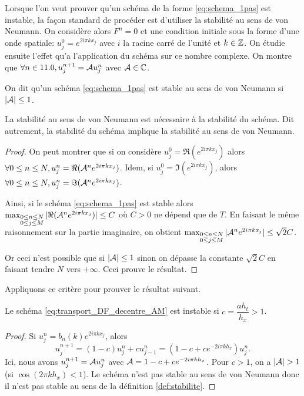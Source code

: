 \documentclass[12pt,a4paper,twoside]{article}
\begin{document}
Lorsque l'on veut prouver qu'un sch\'ema de la forme \eqref{eq:schema_1pas}
est instable, la fa\c{c}on standard
de proc\'eder est d'utiliser la stabilit\'e au sens de von Neumann.
On consid\`ere alors $F^n = 0$ et une condition initiale sous la forme
d'une onde spatiale: $u_j^0 = e^{2 i \pi k x_j}$ avec $i$ la racine carr\'e de l'unit\'e
et $k \in \mathbb{Z}$.
On \'etudie ensuite l'effet qu'a l'application du sch\'ema sur ce nombre complexe.
On montre que $\forall n \in 11.0, u_j^{n+1} = \mathcal{A} u_j^n$ avec $\mathcal{A} \in \mathbb{C}$.
\begin{definition}
  On dit qu'un sch\'ema \eqref{eq:schema_1pas} est stable au
  sens de von Neumann si $| \mathcal{A} | \leq 1$.
\end{definition}
\begin{proposition}
  La stabilit\'e au sens de von Neumann est n\'ecessaire \`a la stabilit\'e du sch\'ema.
  Dit autrement, la stabilit\'e du sch\'ema implique la stabilit\'e au sens de 
  von Neumann.
\end{proposition}
\begin{proof}
  On peut montrer que si on consid\`ere $u_j^0 = \Re (e^{2 i \pi k x_j})$
  alors $\forall 0 \leq n \leq N, u_j^n = \Re (\mathcal{A}^n e^{2 i \pi k x_j})$.
  Idem, si $u_j^0 = \Im (e^{2 i \pi k x_j})$, 
  alors $\forall 0 \leq n \leq N, u_j^n = \Im (\mathcal{A}^n e^{2 i \pi k x_j})$.
  
  Ainsi, si le sch\'ema \eqref{eq:schema_1pas} est stable alors
  $\max_{\substack{0 \leq n \leq N \\ 0 \leq j \leq M}} 
  | \Re (\mathcal{A}^n e^{2 i \pi k x_j})| \leq C$ o\`u $C>0$ ne d\'epend que de $T$.
  En faisant le m\^eme raisonnement sur la partie imaginaire,
  on obtient
  $\max_{\substack{0 \leq n \leq N \\ 0 \leq j \leq M}} 
  | \mathcal{A}^n e^{2 i \pi k x_j}| \leq \sqrt{2}C$.
  
  Or ceci n'est possible que si $| \mathcal{A} | \leq 1$ sinon on d\'epasse
  la constante $\sqrt{2}C$ en faisant tendre $N$ vers $+\infty$.
  Ceci prouve le r\'esultat.
\end{proof}

Appliquons ce crit\`ere pour prouver le r\'esultat suivant.
\begin{proposition}
  Le sch\'ema \eqref{eq:transport_DF_decentre_AM} est instable
  si $c = \dfrac{a h_t}{h_x} > 1$.
\end{proposition}
\begin{proof}
  Si $u_j^n = b_n(k) e^{2i\pi k x_j}$, alors
  \[
    u_j^{n+1} = (1-c) u_j^n + c u_{j-1}^n = (1 - c + c e^{-2i\pi k h_x}) u_j^n .
  \]
  Ici, nous avons $u_j^{n+1} = \mathcal{A} u_j^n$ avec $\mathcal{A} = 1 - c + c e^{-2i\pi k h_x}$.
  Pour $c > 1$, on a $| \mathcal{A} | > 1$ (si $\cos(2\pi k h_x) < 1$). 
  Le sch\'ema n'est pas stable au sens 
  de von Neumann donc il n'est pas stable au sens de la d\'efinition \ref{def:stabilite}.
\end{proof}
\end{document}
